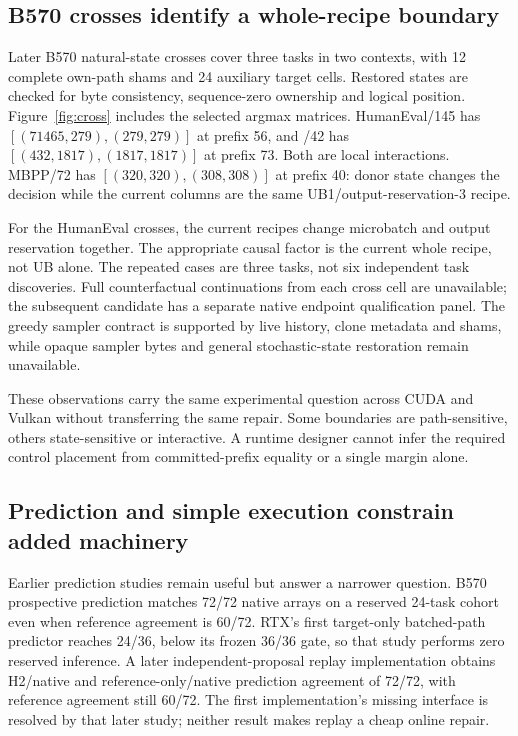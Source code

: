 \subsection{B570 crosses identify a whole-recipe boundary}
Later B570 natural-state crosses cover three tasks in two contexts, with 12 complete own-path shams and 24 auxiliary target cells. Restored states are checked for byte consistency, sequence-zero ownership and logical position. Figure~\ref{fig:cross} includes the selected argmax matrices. HumanEval/145 has $[(71465,279),(279,279)]$ at prefix 56, and /42 has $[(432,1817),(1817,1817)]$ at prefix 73. Both are local interactions. MBPP/72 has $[(320,320),(308,308)]$ at prefix 40: donor state changes the decision while the current columns are the same UB1/output-reservation-3 recipe.

For the HumanEval crosses, the current recipes change microbatch and output reservation together. The appropriate causal factor is the current whole recipe, not UB alone. The repeated cases are three tasks, not six independent task discoveries. Full counterfactual continuations from each cross cell are unavailable; the subsequent candidate has a separate native endpoint qualification panel. The greedy sampler contract is supported by live history, clone metadata and shams, while opaque sampler bytes and general stochastic-state restoration remain unavailable.

These observations carry the same experimental question across CUDA and Vulkan without transferring the same repair. Some boundaries are path-sensitive, others state-sensitive or interactive. A runtime designer cannot infer the required control placement from committed-prefix equality or a single margin alone.

\subsection{Prediction and simple execution constrain added machinery}
Earlier prediction studies remain useful but answer a narrower question. B570 prospective prediction matches 72/72 native arrays on a reserved 24-task cohort even when reference agreement is 60/72. RTX's first target-only batched-path predictor reaches 24/36, below its frozen 36/36 gate, so that study performs zero reserved inference. A later independent-proposal replay implementation obtains H2/native and reference-only/native prediction agreement of 72/72, with reference agreement still 60/72. The first implementation's missing interface is resolved by that later study; neither result makes replay a cheap online repair.

